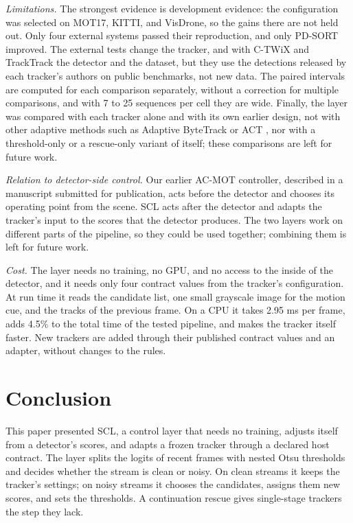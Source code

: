 \documentclass[pdflatex,sn-mathphys-num]{sn-jnl}
\newcommand{\scl}{SCL}
\begin{document}
\emph{Limitations.} The strongest evidence is development evidence: the
configuration was selected on MOT17, KITTI, and VisDrone, so the gains there
are not held out. Only four external systems passed their reproduction, and
only PD-SORT improved. The external tests change the tracker, and with C-TWiX
and TrackTrack the detector and the dataset, but they use the detections
released by each tracker's authors on public benchmarks, not new data. The
paired intervals are computed for each comparison separately, without a
correction for multiple comparisons, and with 7 to 25 sequences per cell they
are wide. Finally, the layer was compared with each tracker alone and with
its own earlier design, not with other adaptive methods such as Adaptive
ByteTrack \cite{ma2023adaptivebytetrack} or ACT \cite{act2026adaptive}, nor
with a threshold-only or a rescue-only variant of itself; these comparisons
are left for future work.

\emph{Relation to detector-side control.} Our earlier AC-MOT controller,
described in a manuscript submitted for publication, acts before the detector
and chooses its operating point from the scene. \scl{} acts after the
detector and adapts the tracker's input to the scores that the detector
produces. The two layers work on different parts of the pipeline, so they
could be used together; combining them is left for future work.

\emph{Cost.} The layer needs no training, no GPU, and no access to the inside
of the detector, and it needs only four contract values from the tracker's
configuration. At run time it reads the candidate list, one small grayscale
image for the motion cue, and the tracks of the previous frame. On a CPU it
takes 2.95 ms per frame, adds 4.5\% to the total time of the tested pipeline,
and makes the tracker itself faster. New trackers are added through their
published contract values and an adapter, without changes to the rules.
\section{Conclusion}\label{sec:conclusion}

This paper presented \scl{}, a control layer that needs no training, adjusts
itself from a detector's scores, and adapts a frozen tracker through a
declared host contract. The layer splits the logits of recent frames with
nested Otsu thresholds and decides whether the stream is clean or noisy. On
clean streams it keeps the tracker's settings; on noisy streams it chooses
the candidates, assigns them new scores, and sets the thresholds. A
continuation rescue gives single-stage trackers the step they lack.
\end{document}
